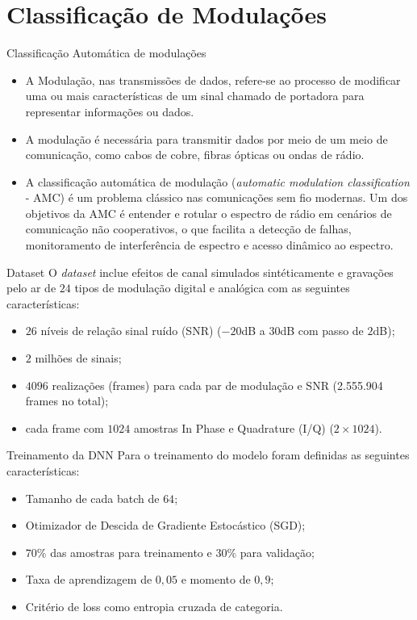 \section{Classificação de Modulações}

\begin{frame}{Classificação Automática de modulações}
    \begin{itemize}
        \item A Modulação, nas transmissões de dados, refere-se ao processo de modificar uma ou mais características de um sinal chamado de portadora para representar informações ou dados. 
        \item A modulação é necessária para transmitir dados por meio de um meio de comunicação, como cabos de cobre, fibras ópticas ou ondas de rádio.
        \item A classificação automática de modulação (\emph{automatic modulation classification} - AMC) é um problema clássico nas comunicações sem fio modernas. Um dos objetivos da AMC é entender e rotular o espectro de rádio em cenários de comunicação não cooperativos, o que facilita a detecção de falhas, monitoramento de interferência de espectro e acesso dinâmico ao espectro.
    \end{itemize}
\end{frame}

\begin{frame}{Dataset}
    O \emph{dataset} inclue efeitos de canal simulados sintéticamente e gravações pelo ar de $24$ tipos de modulação digital e analógica com as seguintes características:
    \begin{itemize}
        \item $26$ níveis de relação sinal ruído (SNR) ($-20$dB a $30$dB com passo de $2$dB);
        \item $2$ milhões de sinais;
        \item $4096$ realizações (frames) para cada par de modulação e SNR (2.555.904 frames no total);
        \item cada frame com $1024$ amostras In Phase e Quadrature (I/Q) ($2 \times 1024$).
    \end{itemize}
\end{frame}

\begin{frame}{Treinamento da DNN}
    Para o treinamento do modelo foram definidas as seguintes características:
    \begin{itemize}
        \item Tamanho de cada batch de $64$;
        \item Otimizador de Descida de Gradiente Estocástico (SGD);
        \item $70\%$ das amostras para treinamento e $30\%$ para validação;
        \item Taxa de aprendizagem de $0,05$ e momento de $0,9$;
        \item Critério de loss como entropia cruzada de categoria.
    \end{itemize}
\end{frame}

